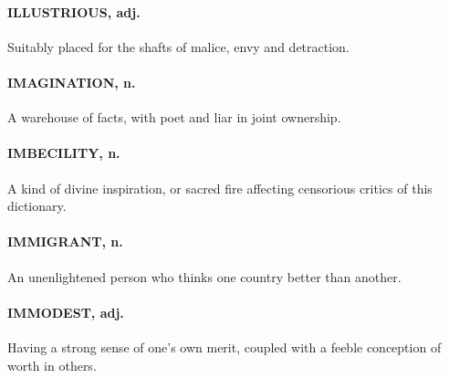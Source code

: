 \documentclass[11pt]{article}
\begin{document}
\paragraph{ILLUSTRIOUS, adj.}  Suitably placed for the shafts of malice, envy and
detraction.

\paragraph{IMAGINATION, n.}  A warehouse of facts, with poet and liar in joint
ownership.

\paragraph{IMBECILITY, n.}  A kind of divine inspiration, or sacred fire affecting
censorious critics of this dictionary.

\paragraph{IMMIGRANT, n.}  An unenlightened person who thinks one country better
than another.

\paragraph{IMMODEST, adj.}  Having a strong sense of one's own merit, coupled with
a feeble conception of worth in others.
\end{document}
